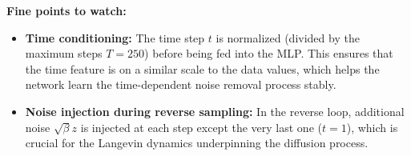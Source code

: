 \documentclass[11pt,a4paper]{article}
\begin{document}
\textbf{Fine points to watch:}

\begin{itemize}
    \item \textbf{Time conditioning:} The time step $t$ is normalized (divided by the maximum steps $T=250$) before being fed into the MLP. This ensures that the time feature is on a similar scale to the data values, which helps the network learn the time-dependent noise removal process stably.
    \item \textbf{Noise injection during reverse sampling:} In the reverse loop, additional noise $\sqrt{\beta} z$ is injected at each step except the very last one ($t=1$), which is crucial for the Langevin dynamics underpinning the diffusion process.
\end{itemize}
\end{document}
